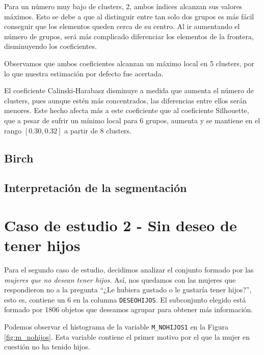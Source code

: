 \documentclass[a4paper, 20pt]{article}
\begin{document}
Para un número muy bajo de clusters, 2, ambos índices alcanzan sus valores máximos. Esto se debe a que al distinguir entre tan solo dos grupos es más fácil conseguir que los elementos queden cerca de su centro. Al ir aumentando el número de grupos, será más complicado diferenciar los elementos de la frontera, disminuyendo los coeficientes.

Observamos que ambos coeficientes alcanzan un máximo local en 5 clusters, por lo que nuestra estimación por defecto fue acertada.

El coeficiente Calinski-Harabasz disminuye a medida que aumenta el número de clusters, pues aunque estén más concentrados, las diferencias entre ellos serán menores. Este hecho afecta más a este coeficiente que al coeficiente Silhouette, que a pesar de sufrir un mínimo local para 6 grupos, aumenta y se mantiene en el rango $[0.30, 0.32]$ a partir de 8 clusters.

\subsection{Birch}


\subsection{Interpretación de la segmentación}

\section{Caso de estudio 2 - Sin deseo de tener hijos}

Para el segundo caso de estudio, decidimos analizar el conjunto formado por las \textit{mujeres que no desean tener hijos}. Así, nos quedamos con las mujeres que respondieron no a la pregunta ``¿Le hubiera gustado o le gustaría tener hijos?'', esto es, contiene un 6 en la columna \texttt{DESEOHIJOS}. El subconjunto elegido está formado por 1806 objetos que deseamos agrupar para obtener más información.

Podemos observar el histograma de la variable \texttt{M\_NOHIJOS1} en la Figura \ref{fig:m_nohijos}. Esta variable contiene el primer motivo por el que la mujer en cuestión no ha tenido hijos.
\end{document}
